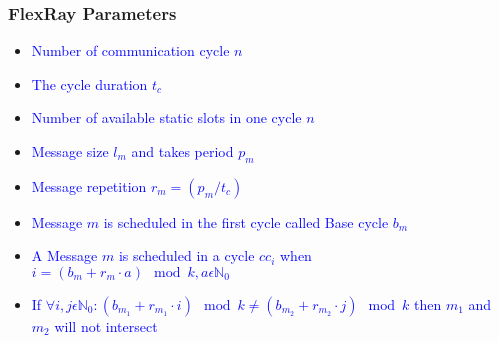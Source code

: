 \begin{frame}
\frametitle{ FlexRay Parameters }
\tiny{\textcolor{blue} {}}


\begin{itemize}
\item \tiny{\textcolor{blue}{Number of communication cycle $n$}}
\item \tiny{\textcolor{blue}{The cycle duration $t_c$}}
\item \tiny{\textcolor{blue}{Number of available static slots in one cycle $n$}}
\item \tiny{\textcolor{blue}{Message size $l_m$ and takes period $p_m$}}
\item \tiny{\textcolor{blue}{Message repetition $r_m = (p_m/t_c)$}}
\item \tiny{\textcolor{blue}{Message $m$ is scheduled in the first cycle called Base cycle $b_m$}}
\item \tiny{\textcolor{blue}{A Message $m$ is scheduled in a cycle $cc_i$ when $i = (b_m + r_m \cdot a) \mod k, a \epsilon {\mathbb{N}_0}$}}
\item \tiny{\textcolor{blue}{If $\forall i,j \epsilon {\mathbb{N}_0} : (b_{m_1} + r_{m_1}\cdot i) \mod k \neq (b_{m_2} + r_{m_2}\cdot j) \mod k$ 
then $m_1$ and $m_2$ will not intersect}}
      
\end{itemize}

\end{frame}